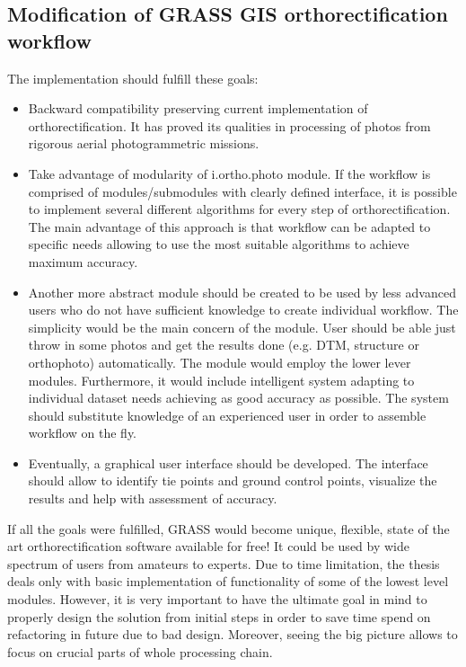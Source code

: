 \documentclass[a4paper,12pt]{article}
\begin{document}
\subsection{Modification of GRASS GIS orthorectification workflow}

The implementation should fulfill these goals:

\begin{itemize}
\item Backward compatibility preserving current implementation of orthorectification.
It has proved its qualities in processing of photos from rigorous aerial photogrammetric missions.
\item Take advantage of modularity of i.ortho.photo module.
If the workflow is comprised of modules/submodules with clearly defined interface, it is possible to implement
several different algorithms for every step of orthorectification. The main advantage of this 
approach is that workflow can be adapted to specific needs allowing to use 
the most suitable algorithms to achieve maximum accuracy.
\item Another more abstract module should be created to be used by less advanced users
who do not have sufficient knowledge to create individual 
workflow. The simplicity would be the main concern of the module. User should be able just throw in   
 some photos and get the results done (e.g. DTM, structure or orthophoto) automatically. 
The module would employ the lower lever modules. Furthermore, it would include intelligent system adapting to individual 
dataset needs achieving as good accuracy as possible. 
The system should substitute knowledge of an experienced user in order to assemble workflow on the fly.
\item Eventually, a graphical user interface should be developed. The interface should 
allow to identify tie points and ground control points, visualize the results and help with assessment of accuracy.  
\end{itemize}

If all the goals were fulfilled, GRASS would become unique, flexible, state of the art orthorectification 
software available for free! It could be used by wide spectrum of users from amateurs to experts.
Due to time limitation, the thesis deals only with basic implementation of functionality of some of the lowest level modules. 
However, it is very important to have 
the ultimate goal in mind to properly design the solution from initial steps in order to save time spend on refactoring in future
 due to bad design. Moreover, seeing the big picture allows to focus on crucial parts of whole processing chain.
\end{document}
